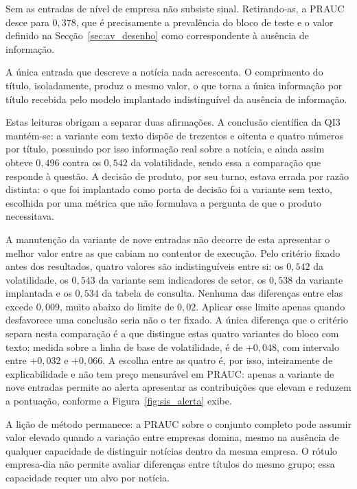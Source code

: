 Sem as entradas de nível de empresa não subsiste sinal. Retirando-as, a \gls{PRAUC} desce para
$0{,}378$, que é precisamente a prevalência do bloco de teste e o valor definido na
Secção~\ref{sec:av_desenho} como correspondente à ausência de informação.

A única entrada que descreve a notícia nada acrescenta. O comprimento do título, isoladamente,
produz o mesmo valor, o que torna a única informação por título recebida pelo modelo
implantado indistinguível da ausência de informação.

Estas leituras obrigam a separar duas afirmações. A conclusão científica da \gls{QI}3 mantém-se: a
variante com texto dispõe de trezentos e oitenta e quatro números por título, possuindo por isso
informação real sobre a notícia, e ainda assim obteve $0{,}496$ contra os $0{,}542$ da volatilidade,
sendo essa a comparação que responde à questão. A decisão de produto, por seu turno, estava errada
por razão distinta: o que foi implantado como porta de decisão foi a variante sem texto, escolhida
por uma métrica que não formulava a pergunta de que o produto necessitava.

A manutenção da variante de nove entradas não decorre de esta apresentar o melhor valor entre as que
cabiam no contentor de execução. Pelo critério fixado antes dos resultados, quatro valores são indistinguíveis entre si: os
$0{,}542$ da volatilidade, os $0{,}543$ da variante sem indicadores de setor, os $0{,}538$ da
variante implantada e os $0{,}534$ da tabela de consulta. Nenhuma das diferenças entre elas excede
$0{,}009$, muito abaixo do limite de $0{,}02$. Aplicar esse limite apenas quando desfavorece uma
conclusão seria não o ter fixado. A única diferença que o
critério separa nesta comparação é a que distingue estas quatro variantes do bloco com texto;
medida sobre a linha de base de volatilidade, é de $+0{,}048$, com intervalo entre $+0{,}032$ e
$+0{,}066$. A escolha entre as quatro é, por isso,
inteiramente de explicabilidade e não tem preço mensurável em \gls{PRAUC}: apenas a variante de nove
entradas permite ao alerta apresentar as contribuições que elevam e reduzem a pontuação, conforme a
Figura~\ref{fig:sis_alerta} exibe.

A lição de método permanece: a \gls{PRAUC} sobre o conjunto completo pode assumir valor elevado
quando a variação entre empresas domina, mesmo na ausência de qualquer capacidade de distinguir
notícias dentro da mesma empresa. O rótulo empresa-dia não permite avaliar diferenças entre títulos
do mesmo grupo; essa capacidade requer um alvo por notícia.

